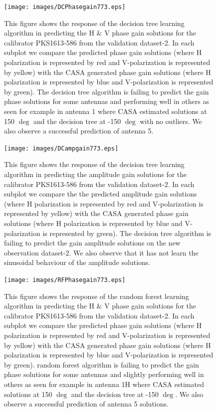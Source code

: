 \begin{figure}[H]
    \texttt{[image: images/DCPhasegain773.eps]}
    \caption{This figure shows the response of the decision tree learning algorithm in predicting the H $\&$ V phase gain solutions for the calibrator PKS1613-586 from the validation dataset-2. In each subplot we compare the predicted phase gain solutions (where H polarization is represented by red and V-polarization is represented by yellow) with the CASA generated phase gain solutions (where H polarization is represented by blue and V-polarization is represented by green). The decision tree algorithm is failing to predict the gain phase solutions for some antennas and performing well in others as seen for example in antenna 1 where CASA estimated solutions at 150 $\deg$ and the decision tree at -150 $\deg$ with no outliers. We also observe a successful prediction of antenna 5.}
    \label{obs9}
\end{figure}

\begin{figure}[H]
    \texttt{[image: images/DCampgain773.eps]}
    \caption{This figure shows the response of the decision tree learning algorithm in predicting the amplitude gain solutions for the calibrator PKS1613-586 from the validation dataset-2. In each subplot we compare the the predicted amplitude gain solutions (where H polarization is represented by red and V-polarization is represented by yellow) with the CASA generated phase gain solutions (where H polarization is represented by blue and V-polarization is represented by green). The decision tree algorithm is failing to predict the gain amplitude solutions on the new observation dataset-2. We also observe that it has not learn the sinusoidal behaviour of the amplitude solutions.}
     \label{da3}
\end{figure}


\begin{figure}[H]
    \texttt{[image: images/RFPhasegain773.eps]}
    \caption{This figure shows the response of the random forest learning algorithm in predicting the H $\&$ V phase gain solutions for the calibrator PKS1613-586 from the validation dataset-2. In each subplot we compare the predicted phase gain solutions (where H polarization is represented by red and V-polarization is represented by yellow) with the CASA generated phase gain solutions (where H polarization is represented by blue and V-polarization is represented by green). random forest algorithm is failing to predict the gain phase solutions for some antennas and slightly performing well in others as seen for example in antenna 1H where CASA estimated solutions at 150 $\deg$ and the decision tree at -150 $\deg$. We also observe a successful prediction of antenna 5 solutions.}
    \label{obs10}
\end{figure}

